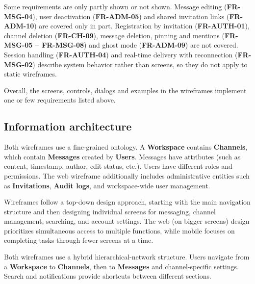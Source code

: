 \documentclass[
    english, %
]{VUMIFPSkursinis}
\begin{document}
Some requirements are only partly shown or not shown. Message editing (\textbf{FR-MSG-04}), user deactivation (\textbf{FR-ADM-05}) and shared invitation links (\textbf{FR-ADM-10}) are covered only in part. Registration by invitation (\textbf{FR-AUTH-01}), channel deletion (\textbf{FR-CH-09}), message deletion, pinning and mentions (\textbf{FR-MSG-05 -- FR-MSG-08}) and ghost mode (\textbf{FR-ADM-09}) are not covered. Session handling (\textbf{FR-AUTH-04}) and real-time delivery with reconnection (\textbf{FR-MSG-02}) describe system behavior rather than screens, so they do not apply to static wireframes.

Overall, the screens, controls, dialogs and examples in the wireframes implement one or few requirements listed above.

\subsection{Information architecture}

Both wireframes use a fine-grained ontology. A \textbf{Workspace} contains \textbf{Channels}, which contain \textbf{Messages} created by \textbf{Users}. Messages have attributes (such as content, timestamp, author, edit status, etc.). Users have different roles and permissions. The web wireframe additionally includes administrative entities such as \textbf{Invitations}, \textbf{Audit logs}, and workspace-wide user management.

Wireframes follow a top-down design approach, starting with the main navigation structure and then designing individual screens for messaging, channel management, searching, and account settings. The web (on bigger screens) design prioritizes simultaneous access to multiple functions, while mobile focuses on completing tasks through fewer screens at a time.

Both wireframes use a hybrid hierarchical-network structure. Users navigate from a \textbf{Workspace} to \textbf{Channels}, then to \textbf{Messages} and channel-specific settings. Search and notifications provide shortcuts between different sections.

\end{document}
